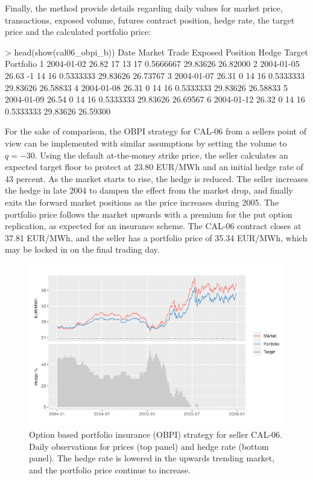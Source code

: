 Finally, the  method provide details regarding daily values for market price, transactions, exposed volume, futures contract position, hedge rate, the target price and the calculated portfolio price:

\begin{example*}
> head(show(cal06_obpi_b))
        Date Market Trade Exposed Position     Hedge   Target Portfolio
1 2004-01-02  26.82    17      13       17 0.5666667 29.83626  26.82000
2 2004-01-05  26.63    -1      14       16 0.5333333 29.83626  26.73767
3 2004-01-07  26.31     0      14       16 0.5333333 29.83626  26.58833
4 2004-01-08  26.31     0      14       16 0.5333333 29.83626  26.58833
5 2004-01-09  26.54     0      14       16 0.5333333 29.83626  26.69567
6 2004-01-12  26.32     0      14       16 0.5333333 29.83626  26.59300
\end{example*}


For the sake of comparison, the OBPI strategy for CAL-06 from a sellers point of view can be implemented with similar assumptions by setting the volume to $q = -30$. Using the default at-the-money strike price, the seller calculates an expected target floor to protect at 23.80 EUR/MWh and an initial hedge rate of 43 percent. As the market starts to rise, the hedge is reduced. The seller increases the hedge in late 2004 to dampen the effect from the market drop, and finally exits the forward market positions as the price increases during 2005. The portfolio price follows the market upwards with a premium for the put option replication,  as expected for an insurance scheme. The CAL-06 contract closes at 37.81 EUR/MWh, and the seller has a portfolio price of 35.34 EUR/MWh, which may be locked in on the final trading day.

\begin{figure}[ht!]
\includegraphics [scale = 0.7] {cal06_obpi_short.png}
\caption{Option based portfolio insurance (OBPI) strategy for seller CAL-06. Daily observations for prices (top panel) and hedge rate (bottom panel). The hedge rate is lowered in the upwards trending market, and the portfolio price continue to increase.}
\label{fig:cal06_obpi_short}
\end{figure}

